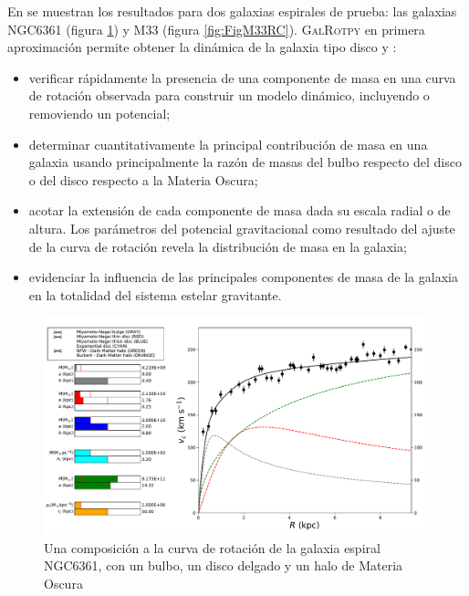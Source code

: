 En \cite{2017arXiv170501665G} se muestran los resultados para dos galaxias espirales de prueba: las galaxias NGC6361 (figura \ref{fig:Fi4}) y M33 (figura \ref{fig:FigM33RC}). \textsc{GalRotpy} en primera aproximación permite obtener la dinámica de la galaxia tipo disco y :

\begin{itemize}
\item verificar rápidamente la presencia de una componente de masa en una curva de rotación observada para construir un modelo dinámico, incluyendo o removiendo un potencial;
\item determinar cuantitativamente la principal contribución de masa en una galaxia usando principalmente la razón de masas del bulbo respecto del disco o del disco respecto a la Materia Oscura;
\item acotar la extensión de cada componente de masa dada su escala radial o de altura. Los parámetros del potencial gravitacional como resultado del ajuste de la curva de rotación revela la distribución de masa en la galaxia;
\item evidenciar la influencia de las principales componentes de masa de la galaxia en la totalidad del sistema estelar gravitante.
\end{itemize}





\begin{figure}
  \centering
  \includegraphics[width=\columnwidth]{Kap2/curve_RotPy.pdf}
  \caption{Una composición a la curva de rotación de la galaxia espiral  NGC6361, con un bulbo, un disco delgado y un halo de Materia Oscura}
  \label{fig:Fi4}
\end{figure}


